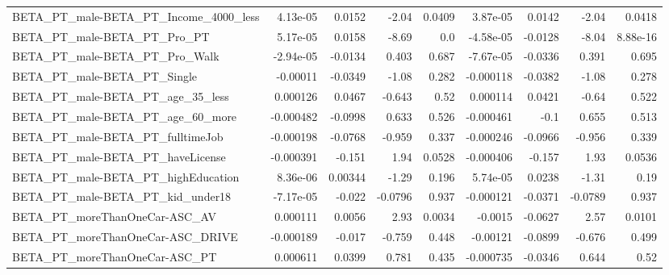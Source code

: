 \begin{tabular}{lrrrrrrrr}
BETA\_PT\_male-BETA\_PT\_Income\_4000\_less              &    4.13e-05 &       0.0152 &     -2.04 &   0.0409 &   3.87e-05 &      0.0142 &        -2.04 &        0.0418 \\
BETA\_PT\_male-BETA\_PT\_Pro\_PT                        &    5.17e-05 &       0.0158 &     -8.69 &      0.0 &  -4.58e-05 &     -0.0128 &        -8.04 &      8.88e-16 \\
BETA\_PT\_male-BETA\_PT\_Pro\_Walk                      &   -2.94e-05 &      -0.0134 &     0.403 &    0.687 &  -7.67e-05 &     -0.0336 &        0.391 &         0.695 \\
BETA\_PT\_male-BETA\_PT\_Single                        &    -0.00011 &      -0.0349 &     -1.08 &    0.282 &  -0.000118 &     -0.0382 &        -1.08 &         0.278 \\
BETA\_PT\_male-BETA\_PT\_age\_35\_less                   &    0.000126 &       0.0467 &    -0.643 &     0.52 &   0.000114 &      0.0421 &        -0.64 &         0.522 \\
BETA\_PT\_male-BETA\_PT\_age\_60\_more                   &   -0.000482 &      -0.0998 &     0.633 &    0.526 &  -0.000461 &        -0.1 &        0.655 &         0.513 \\
BETA\_PT\_male-BETA\_PT\_fulltimeJob                   &   -0.000198 &      -0.0768 &    -0.959 &    0.337 &  -0.000246 &     -0.0966 &       -0.956 &         0.339 \\
BETA\_PT\_male-BETA\_PT\_haveLicense                   &   -0.000391 &       -0.151 &      1.94 &   0.0528 &  -0.000406 &      -0.157 &         1.93 &        0.0536 \\
BETA\_PT\_male-BETA\_PT\_highEducation                 &    8.36e-06 &      0.00344 &     -1.29 &    0.196 &   5.74e-05 &      0.0238 &        -1.31 &          0.19 \\
BETA\_PT\_male-BETA\_PT\_kid\_under18                   &   -7.17e-05 &       -0.022 &   -0.0796 &    0.937 &  -0.000121 &     -0.0371 &      -0.0789 &         0.937 \\
BETA\_PT\_moreThanOneCar-ASC\_AV                      &    0.000111 &       0.0056 &      2.93 &   0.0034 &    -0.0015 &     -0.0627 &         2.57 &        0.0101 \\
BETA\_PT\_moreThanOneCar-ASC\_DRIVE                   &   -0.000189 &       -0.017 &    -0.759 &    0.448 &   -0.00121 &     -0.0899 &       -0.676 &         0.499 \\
BETA\_PT\_moreThanOneCar-ASC\_PT                      &    0.000611 &       0.0399 &     0.781 &    0.435 &  -0.000735 &     -0.0346 &        0.644 &          0.52 \\

\end{tabular}
